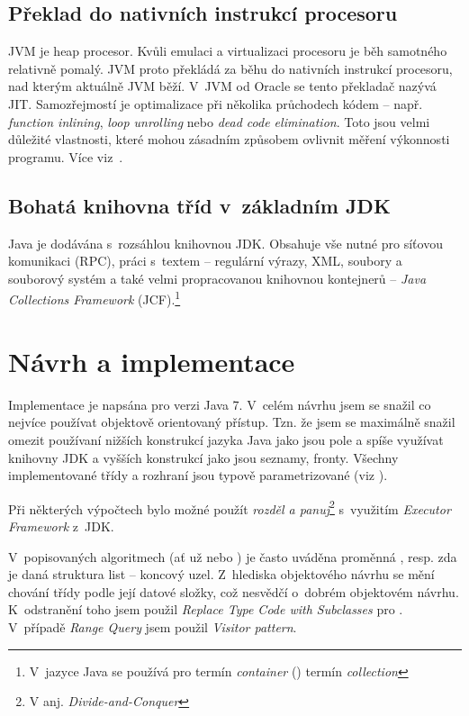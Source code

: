\subsection{Překlad \bytecode{} do nativních instrukcí procesoru}

JVM je heap procesor.
Kvůli emulaci a virtualizaci procesoru je běh samotného \bytecode{} relativně pomalý.
JVM proto překládá za běhu \bytecode{} do nativních instrukcí procesoru, nad kterým aktuálně JVM běží.
V~JVM od Oracle se tento překladač nazývá JIT\cite{hunt2011java}.
Samozřejmostí je optimalizace při několika průchodech kódem -- např. \emph{function inlining}, \emph{loop unrolling} nebo \emph{dead code elimination}\cite{hunt2011java}.
Toto jsou velmi důležité vlastnosti, které mohou zásadním způsobem ovlivnit měření výkonnosti programu. Více viz~.

\subsection{Bohatá knihovna tříd v~základním JDK}

Java je dodávána s~rozsáhlou knihovnou JDK. Obsahuje vše nutné
pro síťovou komunikaci (RPC), práci s~textem -- regulární výrazy,
XML, soubory a souborový
systém a také velmi propracovanou knihovnou kontejnerů -- \emph{Java
Collections Framework }(JCF).\footnote{V~jazyce Java se používá pro termín \emph{container} (\CC) termín \emph{collection}}

\section{Návrh a implementace}
Implementace  je napsána pro verzi Java 7.
V~celém návrhu jsem se snažil co nejvíce používat objektově orientovaný přístup.
Tzn. že jsem se maximálně snažil omezit používaní nižších konstrukcí jazyka Java jako jsou pole a spíše využívat knihovny JDK a vyšších konstrukcí jako jsou seznamy, fronty.
Všechny implementované třídy a rozhraní jsou typově parametrizované (viz ).

Při některých výpočtech bylo možné použít \emph{rozděl a panuj}\cite{Cormen:2001:IA:580470}\footnote{V anj. \emph{Divide-and-Conquer}} s~využitím \emph{Executor Framework} z~JDK.

V~popisovaných algoritmech (ať už \BPTree{} nebo \MIndex{}) je často uváděna proměnná , resp. zda je daná struktura list -- koncový uzel.
Z~hlediska objektového návrhu se mění chování třídy podle její datové složky, což nesvědčí o~dobrém objektovém návrhu.
K~odstranění toho jsem použil \emph{Replace Type Code with Subclasses}\cite{fowler1999refactoring} pro \BPTree{}.
V~případě \MIndex{} \emph{Range Query} jsem použil \emph{Visitor pattern}\cite{gamma1995design}.

